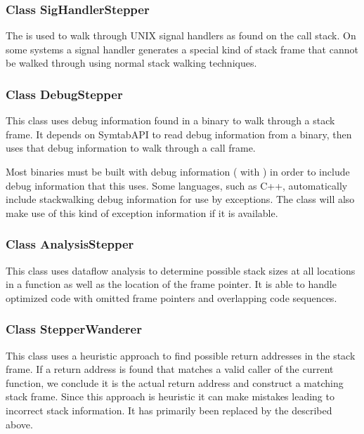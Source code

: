 \subsubsection{Class SigHandlerStepper}


The  is used to walk through UNIX signal handlers as found on
the call stack. On some systems a signal handler generates a special kind of
stack frame that cannot be walked through using normal stack walking techniques.


\subsubsection{Class DebugStepper}


This class uses debug information found in a binary to walk through a stack
frame. It depends on SymtabAPI to read debug information from a binary, then
uses that debug information to walk through a call frame.

Most binaries must be built with debug information ( with ) in order to
include debug information that this  uses. Some languages, such as
C++, automatically include stackwalking debug information for use by exceptions.
The  class will also make use of this kind of exception
information if it is available.

\subsubsection{Class AnalysisStepper}


This class uses dataflow analysis to determine possible stack sizes at
all locations in a function as well as the location of the frame
pointer. It is able to handle optimized code with omitted frame
pointers and overlapping code sequences.

\subsubsection{Class StepperWanderer}


This class uses a heuristic approach to find possible return addresses
in the stack frame. If a return address is found that matches a valid
caller of the current function, we conclude it is the actual return
address and construct a matching stack frame. Since this approach is
heuristic it can make mistakes leading to incorrect stack
information. It has primarily been replaced by the
 described above.

